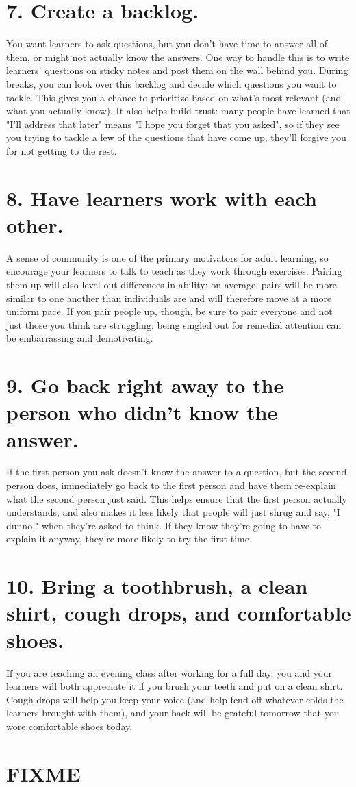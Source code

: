 \documentclass[10pt,letterpaper]{article}
\newcommand{\rulemajor}[1]{\section{#1}}
\begin{document}
\rulemajor{7. Create a backlog.}

You want learners to ask questions, but you don't have time to answer all of them,
or might not actually know the answers.
One way to handle this is to write learners' questions on sticky notes and post them on the wall behind you.
During breaks,
you can look over this backlog and decide which questions you want to tackle.
This gives you a chance to prioritize based on what's most relevant (and what you actually know).
It also helps build trust:
many people have learned that "I'll address that later" means "I hope you forget that you asked",
so if they see you trying to tackle a few of the questions that have come up,
they'll forgive you for not getting to the rest.

\rulemajor{8. Have learners work with each other.}

A sense of community is one of the primary motivators for adult learning,
so encourage your learners to talk to teach as they work through exercises.
Pairing them up will also level out differences in ability:
on average, pairs will be more similar to one another than individuals are
and will therefore move at a more uniform pace.
If you pair people up, though, be sure to pair everyone and not just those you think are struggling:
being singled out for remedial attention can be embarrassing and demotivating.

\rulemajor{9. Go back right away to the person who didn't know the answer.}

If the first person you ask doesn't know the answer to a question,
but the second person does,
immediately go back to the first person and have them re-explain
what the second person just said.
This helps ensure that the first person actually understands,
and also makes it less likely that people will just shrug and say, "I dunno," when they're asked to think.
If they know they're going to have to explain it anyway,
they're more likely to try the first time.

\rulemajor{10. Bring a toothbrush, a clean shirt, cough drops, and comfortable shoes.}

If you are teaching an evening class after working for a full day,
you and your learners will both appreciate it if you brush your teeth and put on a clean shirt.
Cough drops will help you keep your voice (and help fend off whatever colds the learners brought with them),
and your back will be grateful tomorrow that you wore comfortable shoes today.

\section*{FIXME}
\end{document}
